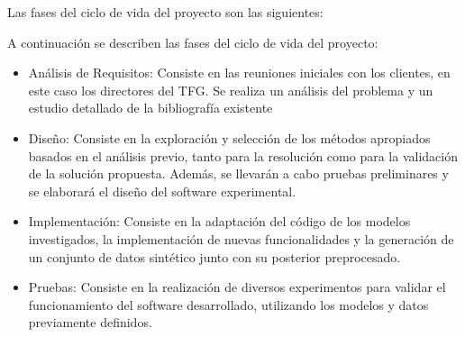Las fases del ciclo de vida del proyecto son las siguientes:

A continuación se describen las fases del ciclo de vida del proyecto:
\begin{itemize}
	\item Análisis de Requisitos: Consiste en las reuniones iniciales con los clientes, en este caso los directores del TFG. Se realiza un análisis del problema y un estudio detallado de la bibliografía existente
	\item Diseño: Consiste en la exploración y selección de los métodos apropiados basados en el análisis previo, tanto para la resolución como para la validación de la solución propuesta. Además, se llevarán a cabo pruebas preliminares y se elaborará el diseño del software experimental.
	\item Implementación: Consiste en la adaptación del código de los modelos investigados, la implementación de nuevas funcionalidades y la generación de un conjunto de datos sintético junto con su posterior preprocesado.
	\item Pruebas: Consiste en la realización de diversos experimentos para validar el funcionamiento del software desarrollado, utilizando los modelos y datos previamente definidos.
\end{itemize}

